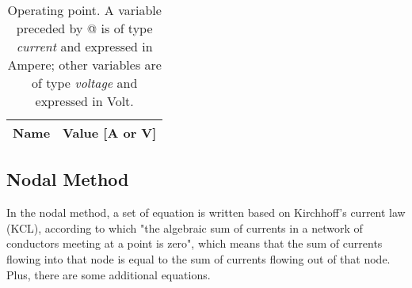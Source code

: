 
\begin{table}[h]
  \centering
  \begin{tabular}{|c|c|}
    \hline    
    {\bf Name} & {\bf Value [A or V]} \\ \hline
    
  \end{tabular}
  \caption{Operating point. A variable preceded by @ is of type {\em current}
    and expressed in Ampere; other variables are of type {\it voltage} and expressed in
    Volt.}
  \label{tab:op}
\end{table}






\subsection{Nodal Method}
\par
In the nodal method, a set of equation is written based on Kirchhoff's current law (KCL), according to which "the algebraic sum of currents in a network of conductors meeting at a point is zero", which means that the sum of currents flowing into that node is equal to the sum of currents flowing out of that node. Plus, there are some additional equations.


